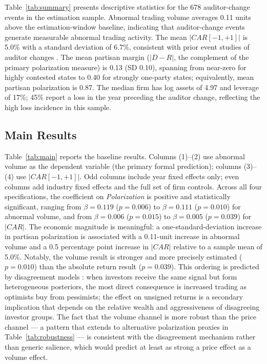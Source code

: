 \documentclass[12pt]{article}
\begin{document}
Table~\ref{tab:summary} presents descriptive statistics for the 678 auditor-change
events in the estimation sample. Abnormal trading volume averages 0.11 units above
the estimation-window baseline, indicating that auditor-change events generate
measurable abnormal trading activity. The mean $|CAR[-1,+1]|$ is 5.0\% with a
standard deviation of 6.7\%, consistent with prior event studies of auditor changes
\citep{defond2014}. The mean partisan margin ($|D-R|$, the complement of the primary polarization
measure) is 0.13 (SD 0.10), spanning from near-zero for highly contested
states to 0.40 for strongly one-party states; equivalently, mean partisan
polarization is 0.87. The median firm has log assets of 4.97 and leverage
of 17\%; 45\% report a loss in the year preceding the auditor change, reflecting
the high loss incidence in this sample.



\subsection{Main Results}

Table~\ref{tab:main} reports the baseline results. Columns (1)--(2) use
abnormal volume as the dependent variable (the primary formal prediction);
columns (3)--(4) use $|CAR[-1,+1]|$. Odd columns include year fixed effects
only; even columns add industry fixed effects and the full set of firm
controls. Across all four specifications, the coefficient on
\textit{Polarization} is positive and statistically significant, ranging
from $\beta = 0.119$ ($p = 0.006$) to $\beta = 0.111$ ($p = 0.010$) for
abnormal volume, and from $\beta = 0.006$ ($p = 0.015$) to
$\beta = 0.005$ ($p = 0.039$) for $|CAR|$.
The economic magnitude is meaningful: a one-standard-deviation increase in partisan
polarization is associated with a 0.11-unit increase in abnormal volume
and a 0.5 percentage point increase in $|CAR|$ relative to a sample mean of 5.0\%.
Notably, the volume result is stronger and more precisely estimated ($p = 0.010$)
than the absolute return result ($p = 0.039$). This ordering is predicted by
disagreement models \citep{kandel1995}: when investors receive the same signal
but form heterogeneous posteriors, the most direct consequence is increased
trading as optimists buy from pessimists; the effect on unsigned returns is a
secondary implication that depends on the relative wealth and aggressiveness of
disagreeing investor groups. The fact that the volume channel is more robust
than the price channel --- a pattern that extends to alternative
polarization proxies in Table~\ref{tab:robustness} --- is consistent with
the disagreement mechanism rather than generic salience, which would
predict at least as strong a price effect as a volume effect.
\end{document}

